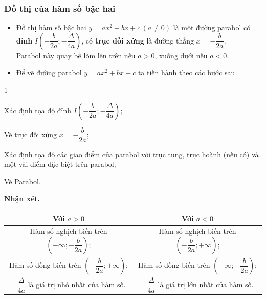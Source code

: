 \subsubsection{Đồ thị của hàm số bậc hai}
\begin{tcolorbox}
\begin{itemize}
	\item Đồ thị hàm số bậc hai $y=ax^2+bx+c\,(a\ne 0)$ là một đường parabol có \textbf{đỉnh} $I\left(-\dfrac{b}{2a};-\dfrac{\Delta}{4a}\right)$, có \textbf{trục đối xứng} là đường thẳng $x=-\dfrac{b}{2a}$. \\
	Parabol này quay bề lõm lên trên nếu $a>0$, xuống dưới nếu $a<0$.
	\item Để vẽ đường parabol $y=ax^2+bx+c$ ta tiến hành theo các bước sau
\end{itemize}
\begin{enumEX}{1}
\item Xác định tọa độ đỉnh $I\left(-\dfrac{b}{2a};-\dfrac{\Delta}{4a}\right)$;
\item Vẽ trục đối xứng $x=-\dfrac{b}{2a}$;
\item Xác định tọa độ các giao điểm của parabol với trục tung, trục hoành (nếu có) và một vài điểm đặc biệt trên parabol; 
\item Vẽ Parabol.
\end{enumEX}
\end{tcolorbox}
\textbf{Nhận xét.}
\begin{center}
\begin{tabular}{|c|c|}
\hline
Với $a>0$& Với $a<0$\\
\hline
Hàm số nghịch biến trên $\left(-\infty;-\dfrac{b}{2a}\right)$;&Hàm số nghịch biến trên $\left(-\dfrac{b}{2a};+\infty\right)$;\\
Hàm số đồng biến trên $\left(-\dfrac{b}{2a};+\infty\right)$;&Hàm số đồng biến trên $\left(-\infty;-\dfrac{b}{2a}\right)$;\\ $-\dfrac{\Delta}{4a}$ là giá trị nhỏ nhất của hàm số.&$-\dfrac{\Delta}{4a}$ là giá trị lớn nhất của hàm số.\\
\hline	
\end{tabular}
\end{center}
